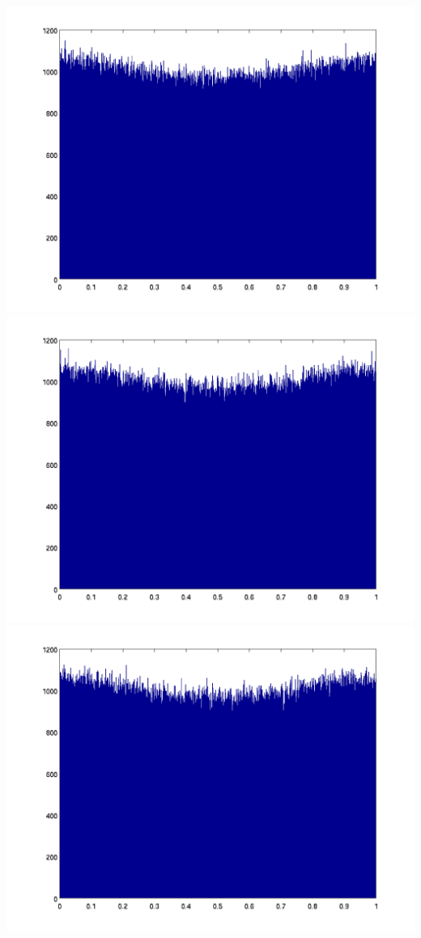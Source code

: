 \documentclass{unswmaths}
\begin{document}
\includegraphics[scale=0.3]{qn_2_a_hist_1}
\includegraphics[scale=0.3]{qn_2_a_hist_2}
\includegraphics[scale=0.3]{qn_2_a_hist_3}
\end{document}
